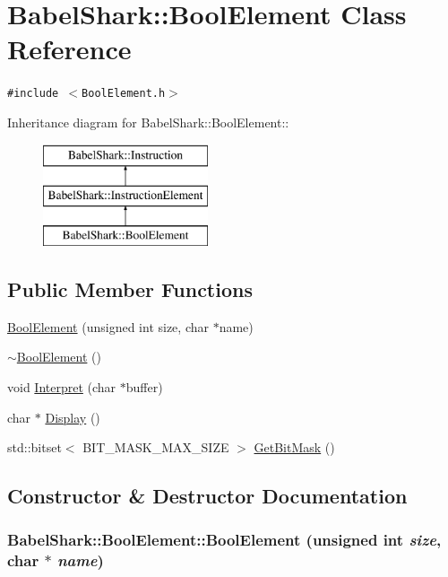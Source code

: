 \hypertarget{class_babel_shark_1_1_bool_element}{
\section{BabelShark::BoolElement Class Reference}
\label{class_babel_shark_1_1_bool_element}
}
{\tt \#include $<$BoolElement.h$>$}

Inheritance diagram for BabelShark::BoolElement::\begin{figure}[H]
\begin{center}
\leavevmode
\includegraphics[height=3cm]{class_babel_shark_1_1_bool_element}
\end{center}
\end{figure}
\subsection*{Public Member Functions}
\begin{CompactItemize}
\item 
\hyperlink{class_babel_shark_1_1_bool_element_19b018393e2c0b1344655d85131a9d5a}{BoolElement} (unsigned int size, char $\ast$name)
\item 
\hyperlink{class_babel_shark_1_1_bool_element_71cee8143fa6926975a4ff619d578de9}{$\sim$BoolElement} ()
\item 
void \hyperlink{class_babel_shark_1_1_bool_element_5eac4fa70d0dcf64414000285324d476}{Interpret} (char $\ast$buffer)
\item 
char $\ast$ \hyperlink{class_babel_shark_1_1_bool_element_7908eb1bccd3d590bfa3da4735bcec76}{Display} ()
\item 
std::bitset$<$ BIT\_\-MASK\_\-MAX\_\-SIZE $>$ \hyperlink{class_babel_shark_1_1_bool_element_0a35c7443eb629eb360b68909a827cd7}{GetBitMask} ()
\end{CompactItemize}


\subsection{Constructor \& Destructor Documentation}
\hypertarget{class_babel_shark_1_1_bool_element_19b018393e2c0b1344655d85131a9d5a}{
\subsubsection[{BoolElement}]{\setlength{\rightskip}{0pt plus 5cm}BabelShark::BoolElement::BoolElement (unsigned int {\em size}, \/  char $\ast$ {\em name})}}
\label{class_babel_shark_1_1_bool_element_19b018393e2c0b1344655d85131a9d5a}


